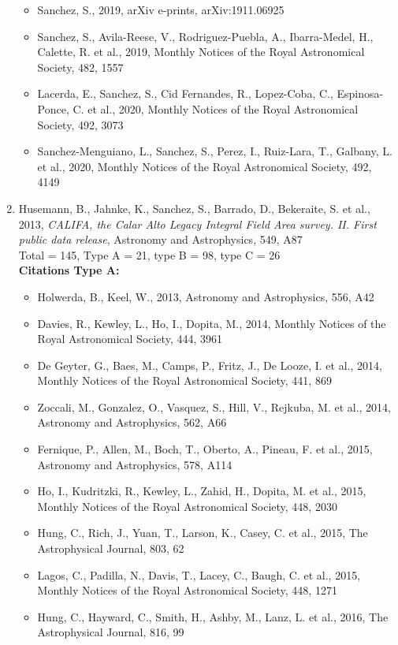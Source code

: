 \documentclass{letter}
\begin{document}
\begin{enumerate}
\begin{itemize}
\item Sanchez, S., 2019, arXiv e-prints, arXiv:1911.06925
\item Sanchez, S., Avila-Reese, V., Rodriguez-Puebla, A., Ibarra-Medel, H., Calette, R. et al., 2019, Monthly Notices of the Royal Astronomical Society, 482, 1557
\item Lacerda, E., Sanchez, S., Cid Fernandes, R., Lopez-Coba, C., Espinosa-Ponce, C. et al., 2020, Monthly Notices of the Royal Astronomical Society, 492, 3073
\item Sanchez-Menguiano, L., Sanchez, S., Perez, I., Ruiz-Lara, T., Galbany, L. et al., 2020, Monthly Notices of the Royal Astronomical Society, 492, 4149
\end{itemize}
\item Husemann, B., Jahnke, K., Sanchez, S., Barrado, D., Bekeraite, S. et al., 2013, {\it CALIFA, the Calar Alto Legacy Integral Field Area survey. II. First public data release}, Astronomy and Astrophysics, 549, A87 \\ 
Total = 145, Type A = 21, type B = 98, type C = 26 \\ 
{\bf Citations Type A:}
\begin{itemize}
\item Holwerda, B., Keel, W., 2013, Astronomy and Astrophysics, 556, A42
\item Davies, R., Kewley, L., Ho, I., Dopita, M., 2014, Monthly Notices of the Royal Astronomical Society, 444, 3961
\item De Geyter, G., Baes, M., Camps, P., Fritz, J., De Looze, I. et al., 2014, Monthly Notices of the Royal Astronomical Society, 441, 869
\item Zoccali, M., Gonzalez, O., Vasquez, S., Hill, V., Rejkuba, M. et al., 2014, Astronomy and Astrophysics, 562, A66
\item Fernique, P., Allen, M., Boch, T., Oberto, A., Pineau, F. et al., 2015, Astronomy and Astrophysics, 578, A114
\item Ho, I., Kudritzki, R., Kewley, L., Zahid, H., Dopita, M. et al., 2015, Monthly Notices of the Royal Astronomical Society, 448, 2030
\item Hung, C., Rich, J., Yuan, T., Larson, K., Casey, C. et al., 2015, The Astrophysical Journal, 803, 62
\item Lagos, C., Padilla, N., Davis, T., Lacey, C., Baugh, C. et al., 2015, Monthly Notices of the Royal Astronomical Society, 448, 1271
\item Hung, C., Hayward, C., Smith, H., Ashby, M., Lanz, L. et al., 2016, The Astrophysical Journal, 816, 99

\end{itemize}
\end{enumerate}
\end{document}
